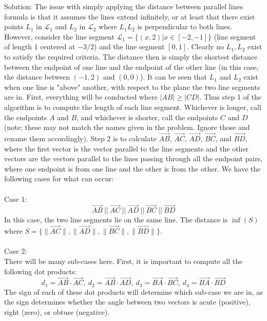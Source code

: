 \documentclass[12pt]{amsbook}
\begin{document}
{\sc Solution}: The issue with simply applying the distance between parallel lines formula is that it assumes the lines extend infinitely, or at least that there exist points $L_1$ in $\mathcal{L}_1$ and $L_2$ in $\mathcal{L}_2$ where $L_1L_2$ is perpendicular to both lines. However, consider the line segment $\mathcal{L}_1=\{(x,2)|x \in [-2,-1]\}$ (line segment of length $1$ centered at $-3/2$) and the line segment $[0,1]$. Clearly no $L_1,L_2$ exist to satisfy the required criteria. The distance then is simply the shortest distance between the endpoint of one line and the endpoint of the other line (in this case, the distance between $(-1,2)$ and $(0,0)$). It can be seen that $L_1$ and $L_2$ exist when one line is "above" another, with respect to the plane the two line segments are in. First, everything will be conducted where $|AB|\geq|CD|$. Thus step 1 of the algorithm is to compute the length of each line segment. Whichever is longer, call the endpoints $A$ and $B$, and whichever is shorter, call the endpoints $C$ and $D$ (note: these may not match the names given in the problem. Ignore those and rename them accordingly). Step 2 is to calculate $\overrightarrow{AB}$, $\overrightarrow{AC}$, $\overrightarrow{AD}$, $\overrightarrow{BC}$, and $\overrightarrow{BD}$, where the first vector is the vector parallel to the line segments and the other vectors are the vectors parallel to the lines passing through all the endpoint pairs, where one endpoint is from one line and the other is from the other. We have the following cases for what can occur:
\\
\\
Case 1:
$$\overrightarrow{AB} \ || \ \overrightarrow{AC} \ || 
\ \overrightarrow{AD} \ || \ \overrightarrow{BC} \ || \ \overrightarrow{BD}$$
In this case, the two line segments lie on the same line. The distance is $\inf (S)$ where $S=\{\|\overrightarrow{AC}\|, \|\overrightarrow{AD}\|, \|\overrightarrow{BC}\|, \|\overrightarrow{BD}\|\}$.
\\
\\
Case 2:
\\
There will be many sub-cases here. First, it is important to compute all the following dot products:
$$d_1=\overrightarrow{AB}\cdot\overrightarrow{AC}, \ d_2=\overrightarrow{AB}\cdot\overrightarrow{AD}, \  d_3=\overrightarrow{BA}\cdot\overrightarrow{BC}, \  d_4=\overrightarrow{BA}\cdot\overrightarrow{BD} $$
The sign of each of these dot products will determine which sub-case we are in, as the sign determines whether the angle between two vectors is acute (positive), right (zero), or obtuse (negative).
\end{document}
